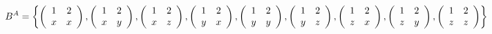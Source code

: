 \begin{example}
    \[
    B^A = \left\{
    \left( \begin{array}{c c}
    1 & 2 \\
    x & x \\
    \end{array} \right),
    \left( \begin{array}{c c}
    1 & 2 \\
    x & y \\
    \end{array} \right),
    \left( \begin{array}{c c}
    1 & 2 \\
    x & z \\
    \end{array} \right),
    \left( \begin{array}{c c}
    1 & 2 \\
    y & x \\
    \end{array} \right),
    \left( \begin{array}{c c}
    1 & 2 \\
    y & y \\
    \end{array} \right),
    \left( \begin{array}{c c}
    1 & 2 \\
    y & z \\
    \end{array} \right),
    \left( \begin{array}{c c}
    1 & 2 \\
    z & x \\
    \end{array} \right),
    \left( \begin{array}{c c}
    1 & 2 \\
    z & y \\
    \end{array} \right),
    \left( \begin{array}{c c}
    1 & 2 \\
    z & z \\
    \end{array} \right)
    \right\}
    \]
\end{example}

